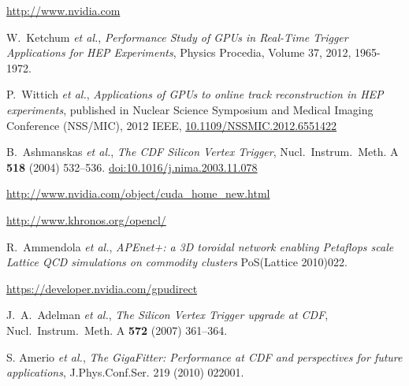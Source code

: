 \documentclass[letterpaper]{jpconf}
\begin{document}
\begin{thebibliography}{99}
 \url{http://www.nvidia.com}

 W.~Ketchum \textit{et al.}, \emph{Performance Study of GPUs in Real-Time Trigger Applications for HEP Experiments},  Physics Procedia, Volume 37, 2012, 1965-1972.

 P.~Wittich \textit{et al.}, \emph{Applications of GPUs to online track reconstruction in HEP experiments}, published in Nuclear Science Symposium and Medical Imaging Conference (NSS/MIC), 2012 IEEE, \href{http://dx.doi.org/10.1109/NSSMIC.2012.6551422}{10.1109/NSSMIC.2012.6551422}

 B.~Ashmanskas \emph{et al.}, \emph{The CDF Silicon    Vertex Trigger}, Nucl.~Instrum.~Meth. A \textbf{518} (2004) 532–536. \href{http://dx.doi.org/10.1016/j.nima.2003.11.078}{doi:10.1016/j.nima.2003.11.078}


 \url{http://www.nvidia.com/object/cuda_home_new.html}

 \url{http://www.khronos.org/opencl/}

 R.~Ammendola \textit{et al.}, \emph{APEnet+: a 3D toroidal network enabling Petaflops scale Lattice QCD simulations on commodity clusters}  PoS(Lattice 2010)022.


 \url{https://developer.nvidia.com/gpudirect}


 J.~A.~Adelman \emph{et al.}, \emph{The Silicon    Vertex Trigger upgrade at CDF}, Nucl.~Instrum.~Meth. A \textbf{572} (2007)  361–364. 

 S. Amerio \emph{et al.}, \emph{The GigaFitter: Performance at CDF and perspectives for future applications}, J.Phys.Conf.Ser. 219 (2010) 022001.


\end{thebibliography}
 
\end{document}
